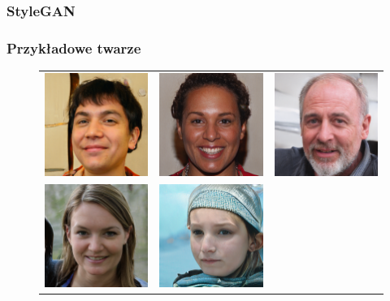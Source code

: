  \subsubsection{StyleGAN}
  \subsubsection{Przykładowe twarze}
\begin{figure}[H]
    \begin{center}
    \renewcommand\tabcolsep{1pt}
    \begin{tabular}{ccc}
      \includegraphics[width=.3\linewidth]{img/gen/1.png} &
      \includegraphics[width=.3\linewidth]{img/gen/2.png} &
      \includegraphics[width=.3\linewidth]{img/gen/3.png} \\
      \includegraphics[width=.3\linewidth]{img/gen/4.png} &
      \includegraphics[width=.3\linewidth]{img/gen/5.png} &

\end{tabular}
\end{center}
\end{figure}
